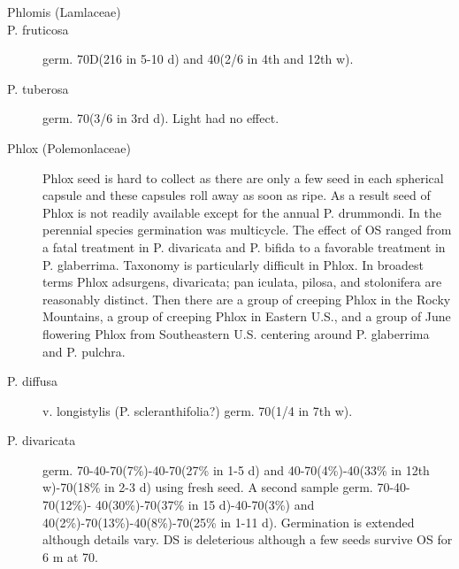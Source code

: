 \begin{description}
\item[Phlomis (Lamlaceae)]
\item[P. fruticosa] germ. 70D(216 in 5-10 d) and 40(2/6 in 4th and 12th w).
\item[P. tuberosa] germ. 70(3/6 in 3rd d). Light had no effect.
\item[Phlox (Polemonlaceae)] Phlox seed is hard to collect as there are only a
few seed in each spherical capsule and these capsules roll away as soon as ripe. As
a result seed of Phlox is not readily available except for the annual P. drummondi. In
the perennial species germination was multicycle. The effect of OS ranged from a fatal
treatment in P. divaricata and P. bifida to a favorable treatment in P. glaberrima.
Taxonomy is particularly difficult in Phlox. In broadest terms Phlox adsurgens,
divaricata; pan iculata, pilosa, and stolonifera are reasonably distinct. Then there are
a group of creeping Phlox in the Rocky Mountains, a group of creeping Phlox in
Eastern U.S., and a group of June flowering Phlox from Southeastern U.S. centering
around P. glaberrima and P. pulchra.

\item[P. diffusa] v. longistylis (P. scleranthifolia?) germ. 70(1/4 in 7th w).
\item[P. divaricata] germ. 70-40-70(7\%)-40-70(27\% in 1-5 d) and 40-70(4\%)-40(33\%
in 12th w)-70(18\% in 2-3 d) using fresh seed. A second sample germ. 70-40-70(12\%)-
40(30\%)-70(37\% in 15 d)-40-70(3\%) and 40(2\%)-70(13\%)-40(8\%)-70(25\% in 1-11
d). Germination is extended although details vary. DS is deleterious although a few
seeds survive OS for 6 m at 70.


\end{description}
